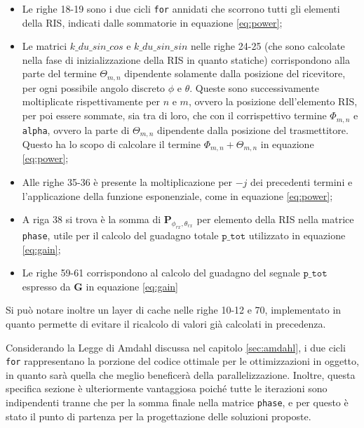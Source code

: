 \begin{itemize}
  \item Le righe 18-19 sono i due cicli \texttt{for} annidati che scorrono tutti
    gli elementi della RIS, indicati dalle sommatorie in equazione \ref{eq:power};

  \item Le matrici $k\_du\_sin\_cos$ e $k\_du\_sin\_sin$ nelle righe 24-25 (che
    sono calcolate nella fase di inizializzazione della RIS in quanto statiche) corrispondono
    alla parte del termine $\Theta_{m,n}$ dipendente solamente dalla posizione del
    ricevitore, per ogni possibile angolo discreto $\phi$ e $\theta$. Queste sono
    successivamente moltiplicate rispettivamente per $n$ e $m$, ovvero la
    posizione dell'elemento RIS, per poi essere sommate, sia tra di loro, che con
    il corrispettivo termine $\Phi_{m,n}$ e \texttt{alpha}, ovvero la parte di $\Theta
    _{m,n}$ dipendente dalla posizione del trasmettitore. Questo ha lo scopo di
    calcolare il termine $\Phi_{m,n}+\Theta_{m,n}$ in equazione \ref{eq:power};

  \item Alle righe 35-36 è presente la moltiplicazione per $-j$ dei precedenti termini
    e l'applicazione della funzione esponenziale, come in equazione
    \ref{eq:power};

  \item A riga 38 si trova è la somma di $\textbf{P}_{\phi_{rx},\theta_{rx}}$ per
    elemento della RIS nella matrice \texttt{phase}, utile per il calcolo del guadagno
    totale $\texttt{p\_tot}$ utilizzato in equazione \ref{eq:gain};

  \item Le righe 59-61 corrispondono al calcolo del guadagno del segnale $\texttt
    {p\_tot}$ espresso da $\textbf{G}$ in equazione \ref{eq:gain}
\end{itemize}

Si può notare inoltre un layer di cache nelle righe 10-12 e 70, implementato in
quanto permette di evitare il ricalcolo di valori già calcolati in precedenza.

Considerando la Legge di Amdahl discussa nel capitolo \ref{sec:amdahl}, i due cicli
\texttt{for} rappresentano la porzione del codice ottimale per le ottimizzazioni
in oggetto, in quanto sarà quella che meglio beneficerà della parallelizzazione.
Inoltre, questa specifica sezione è ulteriormente vantaggiosa poiché tutte le iterazioni
sono indipendenti tranne che per la somma finale nella matrice \texttt{phase}, e
per questo è stato il punto di partenza per la progettazione delle soluzioni proposte.

